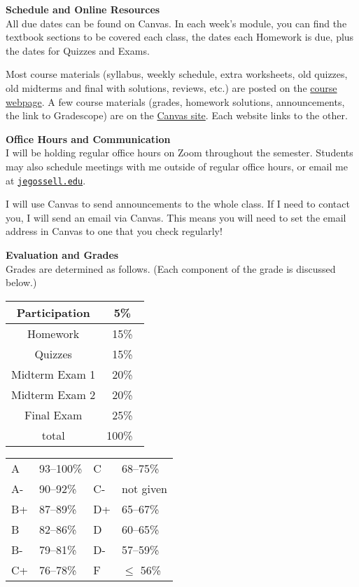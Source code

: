 \documentclass[12pt]{article}
\renewcommand{\emph}[1]{\textsf{\textbf{#1}}}
\newcommand{\localhead}[1]{\par\smallskip\textbf{#1} \smallskip\nobreak\\}%
\def\heading#1{\localhead{\large\emph{#1}}}
\begin{document}
\pagebreak

\heading{Schedule and Online Resources}
All due dates can be found on Canvas. In each week's module, you can find the textbook sections to be covered each class, the dates each Homework is due, plus the dates for Quizzes and Exams.

Most course materials (syllabus, weekly schedule, extra worksheets, old quizzes, old midterms and final with solutions, reviews, etc.) are posted on the \href{https://uaf-math251.github.io/calc2/}{course webpage}.  A few course materials (grades, homework solutions, announcements, the link to Gradescope) are on the \href{https://canvas.alaska.edu/courses/21589}{Canvas site}.  Each website links to the other.


\heading{Office Hours and Communication}
I will be holding regular office hours on Zoom throughout the semester. Students may also schedule meetings with me outside of regular office hours, or email me at \href{mailto:jegossell@alaska.edu}{\texttt{jegossell\@@alaska.edu}}.

I will use Canvas to send announcements to the whole class. If I need to contact you, I will send an email via Canvas.  This means you will need to set the email address in Canvas to one that you check regularly!


\heading{Evaluation and Grades}
Grades are determined as follows.  (Each component of the grade is discussed below.)
 
\begin{multicols}{2}
\begin{tabular}{|c|c|}
\hline
Participation & 5\%\\
\hline
Homework & 15\% \\
\hline
Quizzes & 15\% \\
\hline
Midterm Exam 1 & 20\% \\
\hline
Midterm Exam 2 & 20\%  \\
\hline
Final Exam & 25\% \\
\hline
total & 100\% \, \\
\hline
\end{tabular}


\begin{tabular}{llll}
A  & 93--100\%& C  & 68--75\%  \\
A- & 90--92\% & C- & not given \\
B+ & 87--89\% & D+ & 65--67\%  \\
B  & 82--86\% & D  & 60--65\%  \\
B- & 79--81\% & D- & 57--59\%  \\
C+ & 76--78\% & F  & $\le$ 56\%
\end{tabular}
\end{multicols}
\end{document}
